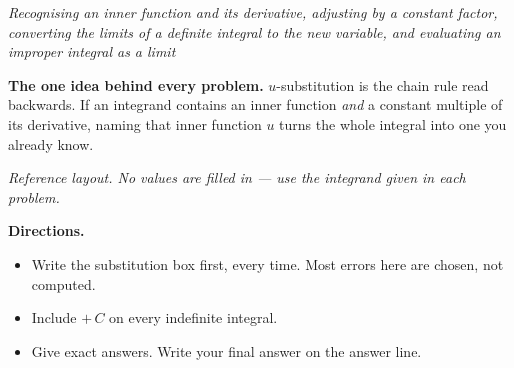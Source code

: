 \documentclass[12pt]{article}
\begin{document}

\begin{center}
\textit{Recognising an inner function and its derivative, adjusting by a constant
factor, converting the limits of a definite integral to the new variable, and
evaluating an improper integral as a limit}
\end{center}

\noindent\textbf{The one idea behind every problem.} $u$-substitution is the
chain rule read backwards. If an integrand contains an inner function \emph{and}
a constant multiple of its derivative, naming that inner function $u$ turns the
whole integral into one you already know.

\begin{center}

\smallskip
\small\textit{Reference layout. No values are filled in --- use the integrand
given in each problem.}\normalsize
\end{center}

\noindent\textbf{Directions.}
\begin{itemize}[leftmargin=1.2cm, itemsep=2pt, topsep=2pt]
\item Write the substitution box first, every time. Most errors here are chosen,
not computed.
\item Include $+\,C$ on every indefinite integral.
\item Give exact answers. Write your final answer on the answer line.
\end{itemize}

\end{document}
